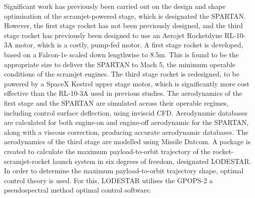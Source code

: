  Significant work has previously been carried out on the design and shape optimisation of the scramjet-powered stage, which is designated the SPARTAN. 
 However, the first stage rocket has not been previously designed, and the third stage rocket has previously been designed to use an Aerojet Rocketdyne RL-10-3A motor, which is a costly, pump-fed motor. 
 A first stage rocket is developed, based on a Falcon-1e scaled down lengthwise to 8.5m. This is found to be the appropriate size to deliver the SPARTAN to Mach 5, the minimum operable conditions of the scramjet engines. The third stage rocket is redesigned, to be powered by a SpaceX Kestrel upper stage motor, which is significantly more cost effective than the RL-10-3A used in previous studies. 
 The aerodynamics of the first stage and the SPARTAN are simulated across their operable regimes, including control surface deflection, using inviscid CFD. Aerodynamic databases are calculated for both engine-on and engine-off aerodynamic for the SPARTAN, along with a viscous correction, producing accurate aerodynamic databases.  
 The aerodynamics of the third stage are modelled using Missile Datcom.
 A package is created to calculate the maximum payload-to-orbit trajectory of the rocket-scramjet-rocket launch system in six degrees of freedom, designated LODESTAR.
 In order to determine the maximum payload-to-orbit trajectory shape, optimal control theory is used. For this, LODESTAR utilises the GPOPS-2 a pseudospectral method optimal control software. 
 

